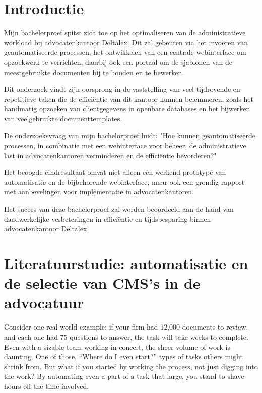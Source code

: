 \section{Introductie}%
\label{sec:introductie}

Mijn bachelorproef spitst zich toe op het optimaliseren van de administratieve workload bij advocatenkantoor Deltalex. Dit zal gebeuren via het invoeren van geautomatiseerde processen, het
ontwikkelen van een centrale webinterface om opzoekwerk te verrichten, daarbij ook een portaal om de sjablonen van de meestgebruikte documenten bij te houden en te bewerken.

Dit onderzoek vindt zijn oorsprong in de vaststelling van veel tijdrovende en repetitieve taken die de efficiëntie van dit kantoor kunnen belemmeren,
zoals het handmatig opzoeken van cliëntgegevens in openbare databases en het bijwerken van veelgebruikte documenttemplates.

De onderzoeksvraag van mijn bachelorproef luidt: "Hoe kunnen geautomatiseerde processen, in combinatie met een webinterface voor beheer, de administratieve
last in advocatenkantoren verminderen en de efficiëntie bevorderen?"

Het beoogde eindresultaat omvat niet alleen een werkend prototype van automatisatie en de bijbehorende webinterface,
maar ook een grondig rapport met aanbevelingen voor implementatie in advocatenkantoren.

Het succes van deze bachelorproef zal worden beoordeeld aan de hand van daadwerkelijke verbeteringen in efficiëntie en
tijdsbesparing binnen advocatenkantoor Deltalex.

\section{Literatuurstudie: automatisatie en de selectie van CMS's in de advocatuur}%
\label{sec:state-of-the-art}

Consider one real-world example: if your firm had 12,000 documents to review, and each one had 75 questions to answer, the task will take weeks to complete. Even with a sizable team working in concert, the sheer volume of work is daunting. One of those, “Where do I even start?” types of tasks others might shrink from.
But what if you started by working the process, not just digging into the work? By automating even a part of a task that large, you stand to shave hours off the time involved.
\autocite{ThomsonReuters2023}

